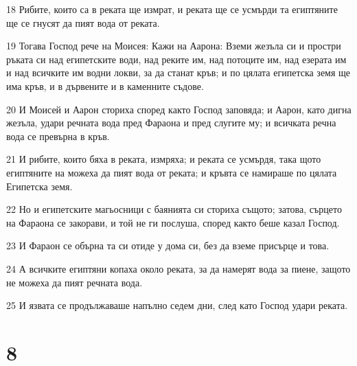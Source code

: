 \par 18 Рибите, които са в реката ще измрат, и реката ще се усмърди та египтяните ще се гнусят да пият вода от реката.
\par 19 Тогава Господ рече на Моисея: Кажи на Аарона: Вземи жезъла си и простри ръката си над египетските води, над реките им, над потоците им, над езерата им и над всичките им водни локви, за да станат кръв; и по цялата египетска земя ще има кръв, и в дървените и в каменните съдове.
\par 20 И Моисей и Аарон сториха според както Господ заповяда; и Аарон, като дигна жезъла, удари речната вода пред Фараона и пред слугите му; и всичката речна вода се превърна в кръв.
\par 21 И рибите, които бяха в реката, измряха; и реката се усмърдя, така щото египтяните на можеха да пият вода от реката; и кръвта се намираше по цялата Египетска земя.
\par 22 Но и египетските магьосници с баянията си сториха същото; затова, сърцето на Фараона се закорави, и той не ги послуша, според както беше казал Господ.
\par 23 И Фараон се обърна та си отиде у дома си, без да вземе присърце и това.
\par 24 А всичките египтяни копаха около реката, за да намерят вода за пиене, защото не можеха да пият речната вода.
\par 25 И язвата се продължаваше напълно седем дни, след като Господ удари реката.

\chapter{8}

